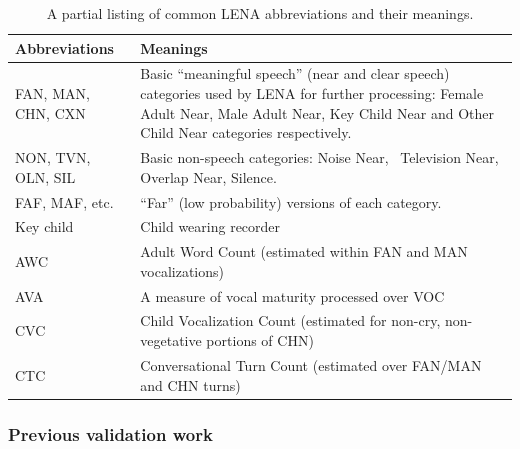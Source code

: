 \documentclass[english,table,man,floatsintext]{apa6}
\begin{document}
\begin{table}[t]

\caption{\label{tab:tab-abb}A partial listing of common LENA abbreviations and their meanings.}
\centering
\begin{tabular}{>{\raggedright\arraybackslash}p{10em}>{\raggedright\arraybackslash}p{30em}}
\toprule
Abbreviations & Meanings\\
\midrule
FAN, MAN, CHN, CXN & Basic “meaningful speech” (near and clear speech) categories used by LENA for further processing: Female Adult Near, Male Adult Near, Key Child Near and Other Child Near categories respectively.\\
NON, TVN, OLN, SIL & Basic non-speech categories: Noise Near,  Television Near, Overlap Near, Silence.\\
FAF, MAF, etc. & “Far” (low probability) versions of each category.\\
Key child & Child wearing recorder\\
AWC & Adult Word Count (estimated within FAN and MAN vocalizations)\\
\addlinespace
AVA & A measure of vocal maturity processed over VOC\\
CVC & Child Vocalization Count (estimated for non-cry, non-vegetative portions of CHN)\\
CTC & Conversational Turn Count (estimated over FAN/MAN and CHN turns)\\
\bottomrule
\end{tabular}
\end{table}

\hypertarget{previous-validation-work}{%
\subsubsection{Previous validation work}\label{previous-validation-work}}
\end{document}
